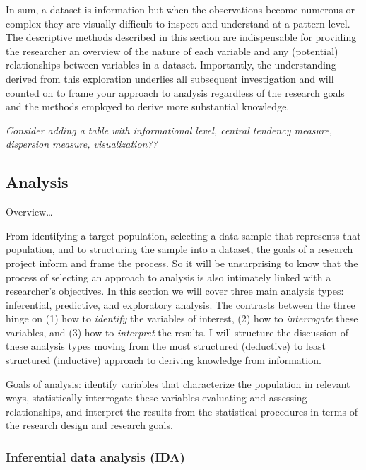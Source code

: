\documentclass[
]{article}
\begin{document}
In sum, a dataset is information but when the observations become numerous or complex they are visually difficult to inspect and understand at a pattern level. The descriptive methods described in this section are indispensable for providing the researcher an overview of the nature of each variable and any (potential) relationships between variables in a dataset. Importantly, the understanding derived from this exploration underlies all subsequent investigation and will counted on to frame your approach to analysis regardless of the research goals and the methods employed to derive more substantial knowledge.

\emph{Consider adding a table with informational level, central tendency measure, dispersion measure, visualization??}

\hypertarget{analysis}{%
\subsection{Analysis}\label{analysis}}

Overview\ldots{}

From identifying a target population, selecting a data sample that represents that population, and to structuring the sample into a dataset, the goals of a research project inform and frame the process. So it will be unsurprising to know that the process of selecting an approach to analysis is also intimately linked with a researcher's objectives. In this section we will cover three main analysis types: inferential, predictive, and exploratory analysis. The contrasts between the three hinge on (1) how to \emph{identify} the variables of interest, (2) how to \emph{interrogate} these variables, and (3) how to \emph{interpret} the results. I will structure the discussion of these analysis types moving from the most structured (deductive) to least structured (inductive) approach to deriving knowledge from information.

Goals of analysis: identify variables that characterize the population in relevant ways, statistically interrogate these variables evaluating and assessing relationships, and interpret the results from the statistical procedures in terms of the research design and research goals.

\hypertarget{inferential-data-analysis-ida}{%
\subsubsection{Inferential data analysis (IDA)}\label{inferential-data-analysis-ida}}
\end{document}
